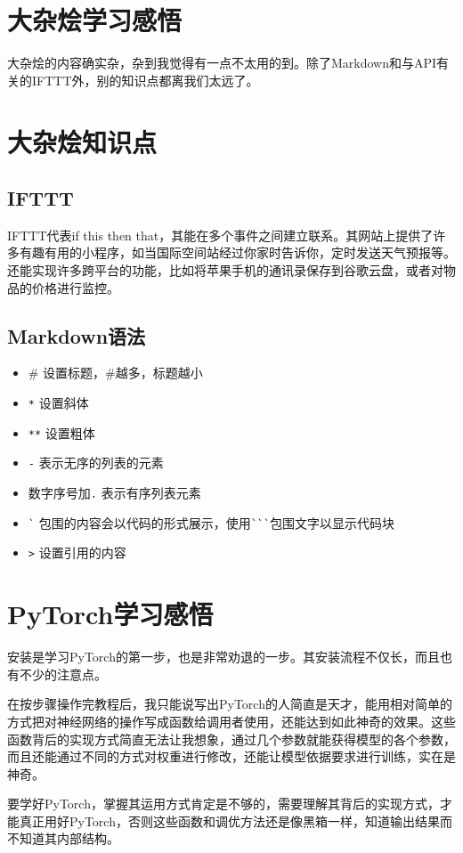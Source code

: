 \documentclass[fontset=ubuntu]{ctexart}
\begin{document}
\section{大杂烩学习感悟}
大杂烩的内容确实杂，杂到我觉得有一点不太用的到。除了Markdown和与API有关的IFTTT外，别的知识点都离我们太远了。

\section{大杂烩知识点}
\subsection{IFTTT}
IFTTT代表if this then that，其能在多个事件之间建立联系。其网站上提供了许多有趣有用的小程序，如当国际空间站经过你家时告诉你，定时发送天气预报等。还能实现许多跨平台的功能，比如将苹果手机的通讯录保存到谷歌云盘，或者对物品的价格进行监控。

\subsection{Markdown语法}
\begin{itemize}
    \item \# 设置标题，\#越多，标题越小
    \item \verb|*| 设置斜体 
    \item \verb|**| 设置粗体
    \item \verb|-| 表示无序的列表的元素
    \item 数字序号加\verb|.| 表示有序列表元素
    \item \verb|`| 包围的内容会以代码的形式展示，使用\verb|```|包围文字以显示代码块
    \item \verb|>| 设置引用的内容
\end{itemize}

\section{PyTorch学习感悟}
安装是学习PyTorch的第一步，也是非常劝退的一步。其安装流程不仅长，而且也有不少的注意点。

在按步骤操作完教程后，我只能说写出PyTorch的人简直是天才，能用相对简单的方式把对神经网络的操作写成函数给调用者使用，还能达到如此神奇的效果。这些函数背后的实现方式简直无法让我想象，通过几个参数就能获得模型的各个参数，而且还能通过不同的方式对权重进行修改，还能让模型依据要求进行训练，实在是神奇。

要学好PyTorch，掌握其运用方式肯定是不够的，需要理解其背后的实现方式，才能真正用好PyTorch，否则这些函数和调优方法还是像黑箱一样，知道输出结果而不知道其内部结构。
\end{document}
